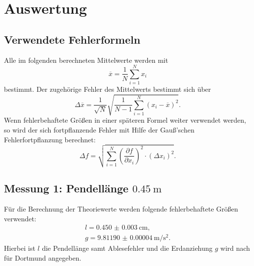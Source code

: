 \section{Auswertung}
\label{sec:Auswertung}
\subsection{Verwendete Fehlerformeln}
Alle im folgenden berechneten Mittelwerte werden mit
\begin{equation}
	\label{eqn:mittelwert}
	\overline x=\frac{1}{N}\sum \limits_{i=1}^{N} x_i
\end{equation}
bestimmt.
Der zugehörige Fehler des Mittelwerts bestimmt sich über
\begin{equation}
	\label{eqn:mittelwertfehler}
	\Delta \overline x= \frac{1}{\sqrt{N}} \sqrt{\frac{1}{N-1} \sum \limits_{i=1}^{N} (x_i- \overline x)^2}\text{.}
\end{equation}
Wenn fehlerbehaftete Größen in einer späteren Formel weiter verwendet werden, so wird der sich fortpflanzende Fehler
mit Hilfe der Gauß’schen Fehlerfortpflanzung berechnet:
\begin{equation}
	\label{eqn:fehlerfortpflanzung}
	\Delta f = \sqrt{ \sum \limits_{i = 1}^{N} (\frac{\partial f}{\partial x_i})^2 \cdot (\Delta x_i)^2}\text{.}
\end{equation}
\FloatBarrier

\subsection{Messung 1: Pendellänge $\SI{0.45}{\meter}$}
Für die Berechnung der Theoriewerte werden folgende fehlerbehaftete Größen verwendet:
\begin{gather*}
	l=\SI{0.450(3)}{\centi\meter} \text{,}\\
	g=\SI{9.81190(4)}{\meter\per\square\second} \text{.}
\end{gather*}
Hierbei ist $l$ die Pendellänge samt Ablesefehler und die Erdanziehung $g$ wird nach \cite{G} für Dortmund angegeben.
